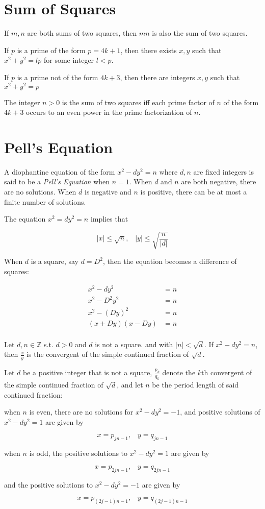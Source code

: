 \documentclass{article}
\begin{document}
\begin{multicols*}{2}
\section{Sum of Squares}

If $m,n$ are both sums of two squares, then $mn$ is also the sum of two squares.

If $p$ is a prime of the form $p = 4k + 1$, then there exists $x,y$ such that $x^2 + y^2 = lp$ for some integer $l < p$.

If $p$ is a prime not of the form $4k + 3$, then there are integers $x, y$ such that $x^2 + y^2 = p$

The integer $n > 0$ is the sum of two squares iff each prime factor of $n$ of the form $4k +3$ occurs to an even power in the prime factorization of $n$.

\section{Pell's Equation}

A diophantine equation of the form $x^2 - dy^2 = n$ where $d,n$ are fixed integers is said to be a \textit{Pell's Equation} when $n = 1$. When $d$ and $n$ are both negative, there are no solutions. When $d$ is negative and $n$ is positive, there can be at most a finite number of solutions.

The equation $x^2 = dy^2 = n$ implies that

\[|x| \leq \sqrt{n},\;\;\;|y| \leq \sqrt{\frac{n}{|d|}}\]

When $d$ is a square, say $d = D^2$, then the equation becomes a difference of squares:

\[
\begin{aligned}
x^2 - dy^2 &= n \\
x^2 - D^2y^2 &= n \\
x^2 - (Dy)^2 &= n \\
(x+Dy)(x-Dy) &= n \\
\end{aligned}
\]

Let $d,n \in \mathbb{Z}$ s.t. $d > 0$ and $d$ is not a square. and with $|n| < \sqrt{d}$. If $x^2 - dy^2 = n$, then $\frac{x}{y}$ is the convergent of the simple continued fraction of $\sqrt{d}$.

Let $d$ be a positive integer that is not a square, $\frac{p_k}{q_k}$ denote the $k$th convergent of the simple continued fraction of $\sqrt{d}$, and let $n$ be the period length of said continued fraction:

when $n$ is even, there are no solutions for $x^2 - dy^2 = -1$, and positive solutions of $x^2 - dy^2 = 1$ are given by

\[x = p_{jn-1},\;\;\;y = q_{jn-1}\]

when $n$ is odd, the positive solutions to $x^2 - dy^2 = 1$ are given by

\[x = p_{2jn-1},\;\;\;y = q_{2jn-1}\]

and the positive solutions to $x^2 - dy^2 = -1$ are given by

\[x = p_{(2j-1)n-1},\;\;\;y = q_{(2j-1)n-1}\]

\end{multicols*}
\end{document}
